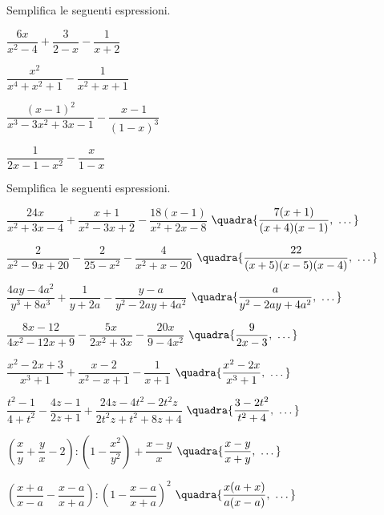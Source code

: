 \begin{esercizio}
\label{ese:19.34}
Semplifica le seguenti espressioni.
\begin{multicols}{2}
\begin{enumeratea}
 \item \(\dfrac{6x}{x^{2}-4}+\dfrac{3}{2-x}-\dfrac{1}{x+2}\)
 \item \(\dfrac{x^{2}}{x^{4}+x^{2}+1}-\dfrac{1}{x^{2}+x+1}\)
 \item \(\dfrac{(x-1)^{2}}{x^{3}-3x^{2}+3x-1}-\dfrac{x-1}{(1-x)^{3}}\)
 \item \(\dfrac{1}{2x-1-x^{2}}-\dfrac{x}{1-x}\)
\end{enumeratea}
\end{multicols}
\end{esercizio}

\begin{esercizio}[\Ast]
\label{ese:19.35}
Semplifica le seguenti espressioni.
\begin{enumeratea}
 \item 
\(\dfrac{24x}{x^{2}+3x-4}+\dfrac{x+1}{x^{2}-3x+2}-\dfrac{18(x-1)}{x^{2}+2x-8}\)
  \hfill {\footnotesize \(\quadra{\dfrac{7(x+1)}{(x+4)(x-1)},~\dots}\)}
 \item \(\dfrac{2}{x^{2}-9x+20}-\dfrac{2}{25-x^{2}}-\dfrac{4}{x^{2}+x-20}\)
  \hfill {\footnotesize \(\quadra{\dfrac{22}{(x+5)(x-5)(x-4)},~\dots}\)}
 \item 
\(\dfrac{4ay-4a^{2}}{y^{3}+8a^{3}}+\dfrac{1}{y+2a}-\dfrac{y-a}{y^{2}-2ay+4a^{2}}
\)
  \hfill {\footnotesize \(\quadra{\dfrac{a}{y^{2}-2ay+4a^{2}},~\dots}\)}
 \item 
\(\dfrac{8x-12}{4x^{2}-12x+9}-\dfrac{5x}{2x^{2}+3x}-\dfrac{20x}{9-4x^{2}}\)
  \hfill {\footnotesize \(\quadra{\dfrac{9}{2x-3},~\dots}\)}
 \item 
\(\dfrac{x^{{2}}-2x+3}{x^{{3}}+1}+\dfrac{x-2}{x^{{2}}-x+1}-\dfrac{1}{x+1}\)
  \hfill {\footnotesize \(\quadra{\dfrac{x^{2}-2x}{x^{3}+1},~\dots}\)}
 \item \(\dfrac{t^{2}-1}{4+t^{2}}-\dfrac{4z-1}{2z+1}+
        \dfrac{24z-4t^{2}-2t^{2}z}{2t^{2}z+t^{2}+8z+4}\)
  \hfill {\footnotesize \(\quadra{\dfrac{3-2t^{2}}{t^{2}+4},~\dots}\)}
 \item \(\left(\dfrac{x}{y}+\dfrac{y}{x}-2\right):\left(1-
        \dfrac{x^{2}}{y^{2}}\right)+\dfrac{x-y}{x}\)
  \hfill {\footnotesize \(\quadra{\dfrac{x-y}{x+y},~\dots}\)}
 \item \(\left(\dfrac{x+a}{x-a}-\dfrac{x-a}{x+a}\right):
        \left(1-\dfrac{x-a}{x+a}\right)^{2}\)
  \hfill {\footnotesize \(\quadra{\dfrac{x(a+x)}{a(x-a)},~\dots}\)}
\end{enumeratea}
\end{esercizio}

